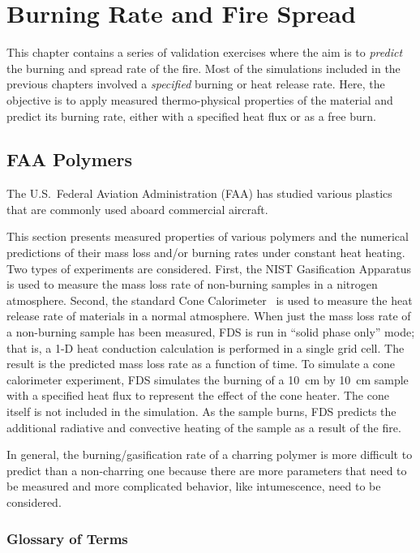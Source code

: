 
\chapter{Burning Rate and Fire Spread}

This chapter contains a series of validation exercises where the aim is to {\em predict} the burning and spread rate of the fire. Most of the simulations included in the previous chapters involved a {\em specified} burning or heat release rate. Here, the objective is to apply measured thermo-physical properties of the material and predict its burning rate, either with a specified heat flux or as a free burn.

\section{FAA Polymers}\label{sec_FAA_Polymers}

The U.S.~Federal Aviation Administration (FAA) has studied various plastics that are commonly used aboard commercial aircraft.

This section presents measured properties of various polymers and the numerical predictions of their mass loss and/or burning rates under constant heat heating. Two types of experiments are considered. First, the NIST Gasification Apparatus is used to measure the mass loss rate of non-burning samples in a nitrogen atmosphere. Second, the standard Cone Calorimeter~\cite{conecal} is used to measure the heat release rate of materials in a normal atmosphere. When just the mass loss rate of a non-burning sample has been measured, FDS is run in ``solid phase only'' mode; that is, a 1-D heat conduction calculation is performed in a single grid cell. The result is the predicted mass loss rate as a function of time. To simulate a cone calorimeter experiment, FDS simulates the burning of a 10~cm by 10~cm sample with a specified heat flux to represent the effect of the cone heater. The cone itself is not included in the simulation. As the sample burns, FDS predicts the additional radiative and convective heating of the sample as a result of the fire.

In general, the burning/gasification rate of a charring polymer is more difficult to predict than a non-charring one because there are more parameters that need to be measured and
more complicated behavior, like intumescence, need to be considered.

\subsection{Glossary of Terms}
\label{glossary}


